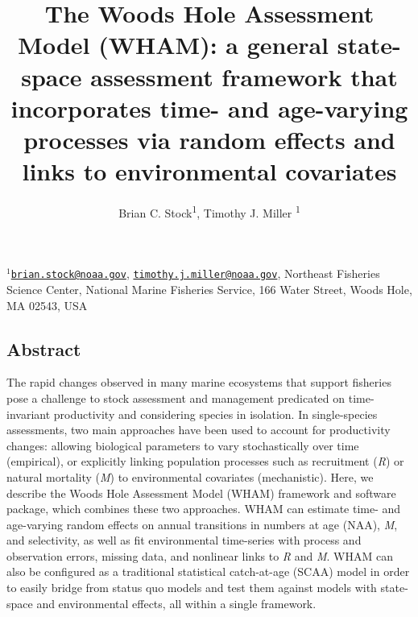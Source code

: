 \documentclass[]{article}
\title{The Woods Hole Assessment Model (WHAM): a general state-space assessment
framework that incorporates time- and age-varying processes via random
effects and links to environmental covariates}
\author{Brian C. Stock\textsuperscript{1}, Timothy J. Miller \textsuperscript{1}}
\date{}
\begin{document}
\maketitle

\(^1\)\href{mailto:brian.stock@noaa.gov}{\nolinkurl{brian.stock@noaa.gov}},
\href{mailto:timothy.j.miller@noaa.gov}{\nolinkurl{timothy.j.miller@noaa.gov}},
Northeast Fisheries Science Center, National Marine Fisheries Service,
166 Water Street, Woods Hole, MA 02543, USA\\

\pagebreak

\hypertarget{abstract}{%
\subsection*{Abstract}\label{abstract}}

The rapid changes observed in many marine ecosystems that support
fisheries pose a challenge to stock assessment and management predicated
on time-invariant productivity and considering species in isolation. In
single-species assessments, two main approaches have been used to
account for productivity changes: allowing biological parameters to vary
stochastically over time (empirical), or explicitly linking population
processes such as recruitment (\emph{R}) or natural mortality (\emph{M})
to environmental covariates (mechanistic). Here, we describe the Woods
Hole Assessment Model (WHAM) framework and software package, which
combines these two approaches. WHAM can estimate time- and age-varying
random effects on annual transitions in numbers at age (NAA), \emph{M},
and selectivity, as well as fit environmental time-series with process
and observation errors, missing data, and nonlinear links to \emph{R}
and \emph{M}. WHAM can also be configured as a traditional statistical
catch-at-age (SCAA) model in order to easily bridge from status quo
models and test them against models with state-space and environmental
effects, all within a single framework.
\end{document}
